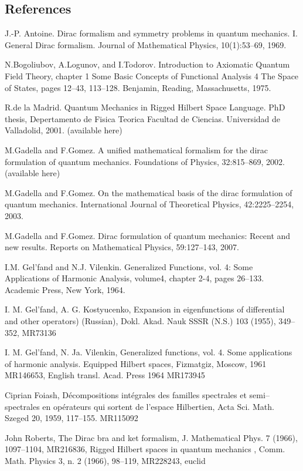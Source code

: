 \documentclass[12pt]{article}
\theoremstyle{plain}
\theoremstyle{definition}
\numberwithin{equation}{section}
\begin{document}
\subsection{References}

J.-P. Antoine. Dirac formalism and symmetry problems in quantum mechanics. I. General Dirac formalism. Journal of Mathematical Physics, 10(1):53--69, 1969.

N.Bogoliubov, A.Logunov, and I.Todorov. Introduction to Axiomatic Quantum Field Theory, chapter 1 Some Basic Concepts of Functional Analysis 4 The Space of States, pages 12--43, 113--128. Benjamin, Reading, Massachusetts, 1975.

R.de la Madrid. Quantum Mechanics in Rigged Hilbert Space Language. PhD thesis, Depertamento de Fisica Teorica Facultad de Ciencias. Universidad de Valladolid, 2001. (available here)

M.Gadella and F.Gomez. A unified mathematical formalism for the dirac formulation of quantum mechanics. Foundations of Physics, 32:815--869, 2002. (available here)

M.Gadella and F.Gomez. On the mathematical basis of the dirac formulation of quantum mechanics. International Journal of Theoretical Physics, 42:2225--2254, 2003.

M.Gadella and F.Gomez. Dirac formulation of quantum mechanics: Recent and new results. Reports on Mathematical Physics, 59:127--143, 2007.

I.M. Gel'fand and N.J. Vilenkin. Generalized Functions, vol. 4: Some Applications of Harmonic Analysis, volume4, chapter 2-4, pages 26--133. Academic Press, New York, 1964.

I. M. Gel'fand, A. G. Kostyucenko, Expansion in eigenfunctions of differential and other operators) (Russian), Dokl. Akad. Nauk SSSR (N.S.) 103 (1955), 349--352, MR73136

I. M. Gel'fand, N. Ja. Vilenkin, Generalized functions, vol. 4. Some applications of harmonic analysis. Equipped Hilbert spaces, Fizmatgiz, Moscow, 1961 MR146653, English transl. Acad. Press 1964 MR173945

Ciprian Foiash, D\'ecompositions int\'egrales des familles spectrales et 
semi--spectrales en op\'erateurs qui sortent de l'espace Hilbertien, Acta Sci. Math. Szeged 20, 1959, 117--155. MR115092

John Roberts, The Dirac bra and ket formalism, J. Mathematical Phys. 7 (1966), 1097--1104, MR216836, Rigged Hilbert spaces in quantum mechanics , Comm. Math. Physics 3, n. 2 (1966), 98--119, MR228243, euclid
\end{document}
